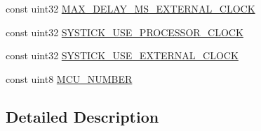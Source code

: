 \begin{DoxyCompactItemize}
\item 
const uint32 \hyperlink{group___sys_const_ga7685932539d3147fd82699683d75aeec}{M\-A\-X\-\_\-\-D\-E\-L\-A\-Y\-\_\-\-M\-S\-\_\-\-E\-X\-T\-E\-R\-N\-A\-L\-\_\-\-C\-L\-O\-C\-K}
\item 
const uint32 \hyperlink{group___sys_const_gafeb8b3fc858a663ca4ae261fa3e00eb8}{S\-Y\-S\-T\-I\-C\-K\-\_\-\-U\-S\-E\-\_\-\-P\-R\-O\-C\-E\-S\-S\-O\-R\-\_\-\-C\-L\-O\-C\-K}
\item 
const uint32 \hyperlink{group___sys_const_gab83647f3f3457eceda11766f6ab5f33c}{S\-Y\-S\-T\-I\-C\-K\-\_\-\-U\-S\-E\-\_\-\-E\-X\-T\-E\-R\-N\-A\-L\-\_\-\-C\-L\-O\-C\-K}
\item 
const uint8 \hyperlink{group___sys_const_gac43093571147afb8eeb655299ec96f4e}{M\-C\-U\-\_\-\-N\-U\-M\-B\-E\-R}
\end{DoxyCompactItemize}


\subsection{Detailed Description}



